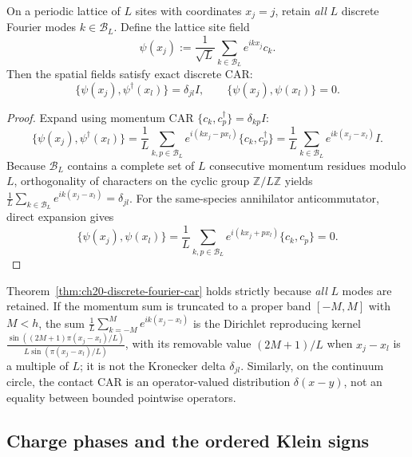 \begin{theorem}
\label{thm:ch20-discrete-fourier-car}
On a periodic lattice of $L$ sites with coordinates $x_j = j$, retain \emph{all} $L$
discrete Fourier modes $k \in \mathcal B_L$.  Define the lattice site field
\begin{equation}
 \psi(x_j) := \frac{1}{\sqrt L}\sum_{k \in \mathcal B_L} e^{i k x_j} c_k.
 \label{eq:ch20-fourier-site-field}
\end{equation}
Then the spatial fields satisfy exact discrete CAR:
\begin{equation}
 \{\psi(x_j), \psi^\dagger(x_l)\} = \delta_{jl} I, \qquad
 \{\psi(x_j), \psi(x_l)\} = 0.
 \label{eq:ch20-exact-lattice-car}
\end{equation}
\end{theorem}
\begin{proof}
Expand using momentum CAR $\{c_k, c_p^\dagger\} = \delta_{kp} I$:
\[
 \{\psi(x_j), \psi^\dagger(x_l)\}
  = \frac{1}{L}\sum_{k, p \in \mathcal B_L} e^{i (k x_j - p x_l)} \{c_k, c_p^\dagger\}
  = \frac{1}{L}\sum_{k \in \mathcal B_L} e^{i k (x_j - x_l)} I.
\]
Because $\mathcal B_L$ contains a complete set of $L$ consecutive momentum residues modulo $L$,
orthogonality of characters on the cyclic group $\mathbb Z / L \mathbb Z$ yields
$\frac{1}{L}\sum_{k \in \mathcal B_L} e^{i k (x_j - x_l)} = \delta_{jl}$.  For the
same-species annihilator anticommutator, direct expansion gives
\[
 \{\psi(x_j),\psi(x_l)\}
 =\frac1L\sum_{k,p\in\mathcal B_L}e^{i(kx_j+px_l)}\{c_k,c_p\}=0.
\]
\end{proof}

\begin{remark}
\label{rem:ch20-fourier-truncation}
Theorem~\ref{thm:ch20-discrete-fourier-car} holds strictly because \emph{all} $L$ modes are retained.
If the momentum sum is truncated to a proper band $[-M, M]$ with $M < h$, the sum
$\frac{1}{L}\sum_{k=-M}^M e^{ik(x_j - x_l)}$ is the Dirichlet reproducing kernel
$\frac{\sin((2M+1)\pi(x_j-x_l)/L)}{L\sin(\pi(x_j-x_l)/L)}$, with its removable value
$(2M+1)/L$ when $x_j-x_l$ is a multiple of $L$; it is not the Kronecker delta $\delta_{jl}$.
Similarly, on the continuum circle, the contact CAR is an operator-valued distribution $\delta(x-y)$,
not an equality between bounded pointwise operators.
\end{remark}

\subsection{Charge phases and the ordered Klein signs}
\label{subsec:ch20-klein}

